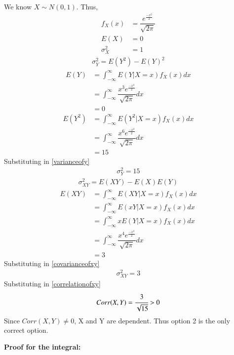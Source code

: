 \documentclass[journal,12pt,twocolumn]{IEEEtran}
\begin{document}
We know $X \sim N(0,1)$. Thus,
\begin{align}
    f_X(x) &= \dfrac{e^{\frac{-x^2}{2}}}{\sqrt{2\pi}}\\
    E(X) &= 0\\
    \sigma_X^2 &= 1
\end{align}
\begin{align}
    \sigma_Y^2 = E(Y^2) - E(Y)^2
    \label{varianceofy}
\end{align}
\begin{align}
    E(Y) &= \int_{-\infty}^{\infty}E(Y|X=x)f_X(x)dx\\
         &= \int_{-\infty}^{\infty}\dfrac{x^3 e^{\frac{-x^2}{2}}}{\sqrt{2\pi}}dx\\
         &= 0
\end{align}
\begin{align}
    E(Y^2) &= \int_{-\infty}^{\infty}E(Y^2|X=x)f_X(x)dx\\
           &= \int_{-\infty}^{\infty}\dfrac{x^6 e^{\frac{-x^2}{2}}}{\sqrt{2\pi}}dx\\
           &= 15
\end{align}
Substituting in \eqref{varianceofy}
\begin{align}
    \sigma_Y^2 = 15
\end{align}
\begin{align}
    \sigma_{XY}^2 = E(XY) - E(X)E(Y)
    \label{covarianceofxy}
\end{align}
\begin{align}
    E(XY) &= \int_{-\infty}^{\infty}E(XY|X=x)f_X(x)dx\\
          &= \int_{-\infty}^{\infty}E(xY|X=x)f_X(x)dx\\
          &= \int_{-\infty}^{\infty}xE(Y|X=x)f_X(x)dx\\
          &= \int_{-\infty}^{\infty}\dfrac{x^4 e^{\frac{-x^2}{2}}}{\sqrt{2\pi}}dx\\
          &= 3
\end{align}
Substituting in \eqref{covarianceofxy}
\begin{align}
    \sigma_{XY}^2 = 3
\end{align}
Substituting in \eqref{correlationofxy}
\begin{align}
    Corr(X,Y) = \cfrac{3}{\sqrt{15}} > 0
\end{align}
Since $Corr(X,Y) \ne 0$, X and Y are dependent. Thus option 2 is the only correct option.

\textbf{Proof for the integral:}
\end{document}

